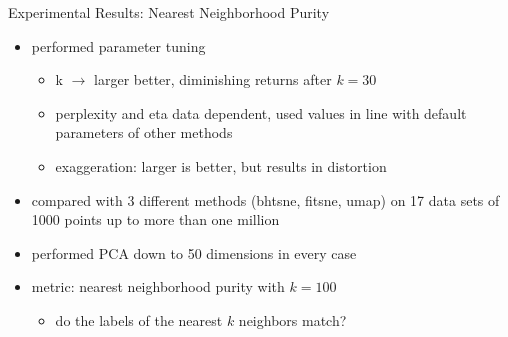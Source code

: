 \documentclass{beamer}
\begin{document}
\begin{frame}[fragile]{Experimental Results: Nearest Neighborhood Purity}
    \begin{itemize}
        \item performed parameter tuning
            \begin{itemize}
                \item k $\rightarrow$ larger better, diminishing returns after $k = 30$
                \item perplexity and eta data dependent, used values in line with default parameters of other methods
                \item exaggeration: larger is better, but results in distortion
            \end{itemize}
        \item compared with 3 different methods (bhtsne, fitsne, umap) on 17 data sets
            of 1000 points up to more than one million
        \item performed PCA down to 50 dimensions in every case
        \item metric: nearest neighborhood purity with $k = 100$
            \begin{itemize}
                \item[~] do the labels of the nearest $k$ neighbors match?
            \end{itemize}
    \end{itemize}
\end{frame}
\end{document}
